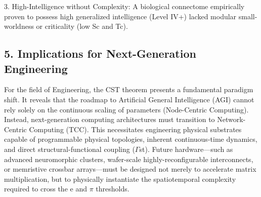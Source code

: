 \documentclass[a4paper,12pt]{article}
\begin{document}
3. High-Intelligence without Complexity: A biological connectome empirically proven to possess high generalized intelligence (Level IV+) lacked modular small-worldness or criticality (low Sc and Tc).



\subsection{5. Implications for Next-Generation Engineering}

For the field of Engineering, the CST theorem presents a fundamental paradigm shift. It reveals that the roadmap to Artificial General Intelligence (AGI) cannot rely solely on the continuous scaling of parameters (Node-Centric Computing). Instead, next-generation computing architectures must transition to Network-Centric Computing (TCC). This necessitates engineering physical substrates capable of programmable physical topologies, inherent continuous-time dynamics, and direct structural-functional coupling ($\Gamma$st). Future hardware---such as advanced neuromorphic clusters, wafer-scale highly-reconfigurable interconnects, or memristive crossbar arrays---must be designed not merely to accelerate matrix multiplication, but to physically instantiate the spatiotemporal complexity required to cross the e and $\pi$ thresholds.
\end{document}
